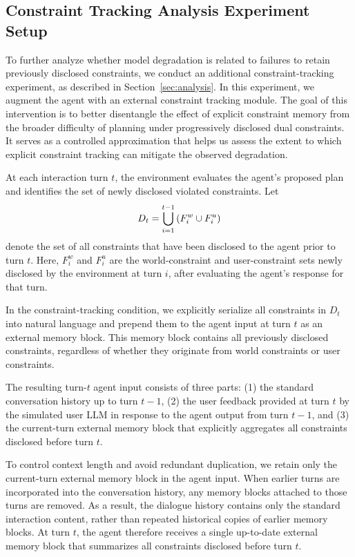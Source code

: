 \subsection{Constraint Tracking Analysis Experiment Setup}
\label{app:memory-analysis-details}


To further analyze whether model degradation is related to failures to retain previously disclosed constraints, we conduct an additional constraint-tracking experiment, as described in Section~\ref{sec:analysis}.
In this experiment, we augment the agent with an external constraint tracking module.
The goal of this intervention is to better disentangle the effect of explicit constraint memory from the broader difficulty of planning under progressively disclosed dual constraints.
It serves as a controlled approximation that helps us assess the extent to which explicit constraint tracking can mitigate the observed degradation.

At each interaction turn $t$, the environment evaluates the agent's proposed plan and identifies the set of newly disclosed violated constraints.
Let
\[
\small
D_t = \bigcup_{i=1}^{t-1} \left( F_i^w \cup F_i^u \right)
\]
denote the set of all constraints that have been disclosed to the agent prior to turn $t$.
Here, $F_i^w$ and $F_i^u$ are the world-constraint and user-constraint sets newly disclosed by the environment at turn $i$, after evaluating the agent's response for that turn.

In the constraint-tracking condition, we explicitly serialize all constraints in $D_t$ into natural language and prepend them to the agent input at turn $t$ as an external memory block.
This memory block contains all previously disclosed constraints, regardless of whether they originate from world constraints or user constraints.

The resulting turn-$t$ agent input consists of three parts:
(1) the standard conversation history up to turn $t-1$,
(2) the user feedback provided at turn $t$ by the simulated user LLM in response to the agent output from turn $t-1$,
and (3) the current-turn external memory block that explicitly aggregates all constraints disclosed before turn $t$.

To control context length and avoid redundant duplication, we retain only the current-turn external memory block in the agent input.
When earlier turns are incorporated into the conversation history, any memory blocks attached to those turns are removed.
As a result, the dialogue history contains only the standard interaction content, rather than repeated historical copies of earlier memory blocks.
At turn $t$, the agent therefore receives a single up-to-date external memory block that summarizes all constraints disclosed before turn $t$.

